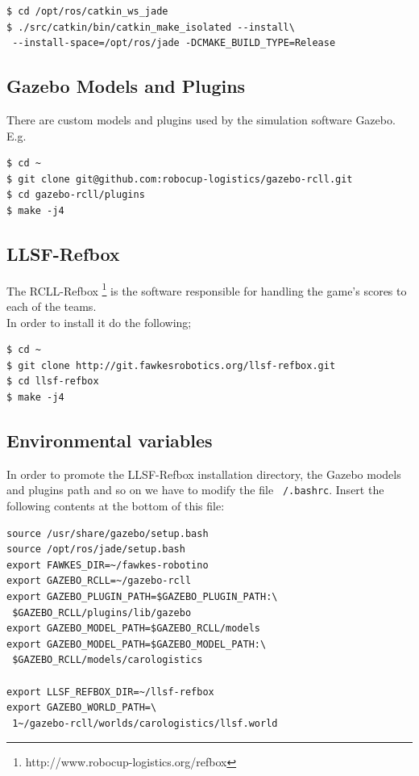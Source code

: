\documentclass[oribibl]{llncs}
\begin{document}
\begin{lstlisting}[frame=single]
$ cd /opt/ros/catkin_ws_jade
$ ./src/catkin/bin/catkin_make_isolated --install\
 --install-space=/opt/ros/jade -DCMAKE_BUILD_TYPE=Release
\end{lstlisting}

\subsection{Gazebo Models and Plugins}
There are custom models and plugins used by the simulation software Gazebo. E.g. 
\begin{lstlisting}[frame=single]
$ cd ~
$ git clone git@github.com:robocup-logistics/gazebo-rcll.git
$ cd gazebo-rcll/plugins
$ make -j4
\end{lstlisting}

\subsection{LLSF-Refbox}
The RCLL-Refbox \footnote{http://www.robocup-logistics.org/refbox} is the software responsible for handling the game's scores to each of the teams.\\
In order to install it do the following;
\begin{lstlisting}[frame=single]
$ cd ~
$ git clone http://git.fawkesrobotics.org/llsf-refbox.git
$ cd llsf-refbox
$ make -j4
\end{lstlisting}

\subsection{Environmental variables}
In order to promote the LLSF-Refbox installation directory, the Gazebo models and plugins path and so on we have to modify the file \texttt{~/.bashrc}. Insert the following contents at the bottom of this file:
\begin{lstlisting}[frame=single]
source /usr/share/gazebo/setup.bash
source /opt/ros/jade/setup.bash
export FAWKES_DIR=~/fawkes-robotino
export GAZEBO_RCLL=~/gazebo-rcll
export GAZEBO_PLUGIN_PATH=$GAZEBO_PLUGIN_PATH:\
 $GAZEBO_RCLL/plugins/lib/gazebo
export GAZEBO_MODEL_PATH=$GAZEBO_RCLL/models
export GAZEBO_MODEL_PATH=$GAZEBO_MODEL_PATH:\
 $GAZEBO_RCLL/models/carologistics

export LLSF_REFBOX_DIR=~/llsf-refbox
export GAZEBO_WORLD_PATH=\
 1~/gazebo-rcll/worlds/carologistics/llsf.world
\end{lstlisting}
\end{document}
